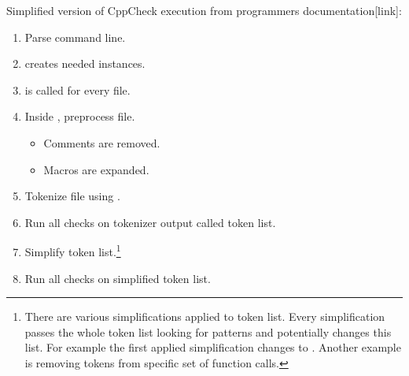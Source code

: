 Simplified version of CppCheck execution from programmers documentation[link]:

\begin{enumerate}
\item Parse command line.
\item {} creates needed  instances.
\item {} is called for every file.
\item Inside , preprocess file.
    \begin{itemize}
    \item Comments are removed.
    \item Macros are expanded.
    \end{itemize}
\item Tokenize file using .
\item Run all checks on tokenizer output called token list.
\item Simplify token list.\footnote{There are various simplifications applied to token list. Every simplification passes the whole token list looking for patterns and potentially changes this list. For example the first applied simplification changes  to . Another example is removing  tokens from specific set of function calls.}
\item Run all checks on simplified token list.
\end{enumerate}

